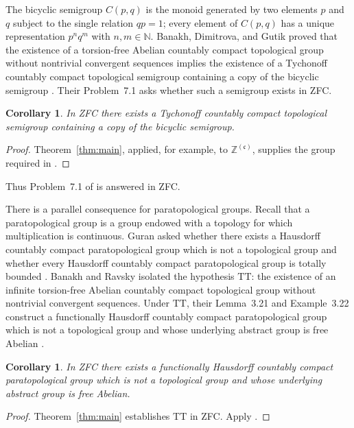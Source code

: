 \documentclass[11pt]{amsart}
\newtheorem{corollary}[theorem]{Corollary}
\theoremstyle{definition}
\newcommand{\N}{\mathbb N}
\newcommand{\Z}{\mathbb Z}
\newcommand{\cfrak}{\mathfrak c}
\begin{document}
The bicyclic semigroup $C(p,q)$ is the monoid generated by two elements $p$
and $q$ subject to the single relation $qp=1$; every element of $C(p,q)$ has
a unique representation $p^nq^m$ with $n,m\in\N$.  Banakh, Dimitrova, and
Gutik proved that the existence of a torsion-free Abelian countably compact
topological group without nontrivial convergent sequences implies the
existence of a Tychonoff countably compact topological semigroup containing a
copy of the bicyclic semigroup
\cite[Theorem~6.6]{BanakhDimitrovaGutik2010}.  Their Problem~7.1 asks whether
such a semigroup exists in ZFC.

\begin{corollary}\label{cor:bicyclic}
In ZFC there exists a Tychonoff countably compact topological semigroup
containing a copy of the bicyclic semigroup.
\end{corollary}

\begin{proof}
Theorem~\ref{thm:main}, applied, for example, to $\Z^{(\cfrak)}$, supplies the
group required in \cite[Theorem~6.6]{BanakhDimitrovaGutik2010}.
\end{proof}

Thus Problem~7.1 of \cite{BanakhDimitrovaGutik2010} is answered in ZFC\@.

There is a parallel consequence for paratopological groups.  Recall that a
paratopological group is a group endowed with a topology for which
multiplication is continuous.  Guran
asked whether there exists a Hausdorff countably compact paratopological group
which is not a topological group and whether every Hausdorff countably compact
paratopological group is totally bounded
\cite[Problems~1 and~2]{Guran1998}.  Banakh and Ravsky isolated the hypothesis
\(\mathrm{TT}\): the existence of an infinite torsion-free Abelian countably
compact topological group without nontrivial convergent sequences.  Under
\(\mathrm{TT}\), their Lemma~3.21 and Example~3.22 construct a functionally
Hausdorff countably compact paratopological group which is not a topological
group and whose underlying abstract group is free Abelian
\cite{BanakhRavsky2020}.

\begin{corollary}\label{cor:paratopological}
In ZFC there exists a functionally Hausdorff countably compact
paratopological group which is not a topological group and whose underlying
abstract group is free Abelian.
\end{corollary}

\begin{proof}
Theorem~\ref{thm:main} establishes \(\mathrm{TT}\) in ZFC\@.  Apply
\cite[Lemma~3.21 and Example~3.22]{BanakhRavsky2020}.
\end{proof}
\end{document}

